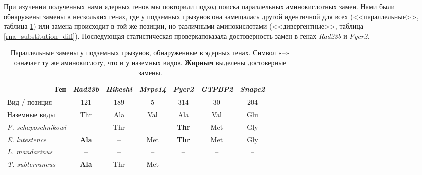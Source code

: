 При изучении полученных нами ядерных генов мы повторили подход поиска параллельных аминокислотных замен. Нами были обнаружены замены в нескольких генах, где у подземных грызунов она замещалась другой идентичной для всех (<<параллельные>>, таблица \ref{rna_substitution_all}) или замена происходит в той же позиции, но различными аминокислотами (<<дивергентные>>, таблица \ref{rna_substitution_diff}). Последующая статистическая проверкапоказала достоверность замен в генах \textit{Rad23b} и \textit{Pycr2}. 

\begin{table}[h!]
	\caption{Параллельные замены у подземных грызунов, обнаруженные в ядерных генах. Символ «--» означает ту же аминокислоту, что и у наземных видов. \textbf{Жирным} выделены достоверные замены. }\label{rna_substitution_all} \vspace{5mm}
	
	\begin{center}
	\begin{tabular}{|l|c|c|c|c|c|c|c|c|c|c}
		\hline
		\multicolumn{1}{|r|}{Ген} & \textit{Rad23b} & \textit{Hikeshi} & \textit{Mrps14} & \textit{Pycr2} & \textit{GTPBP2} & \textit{Snapc2} \\ \hline
		Вид   / позиция & 121 & 189 & 5 & 314 & 30 & 204  \\ \hline
		Наземные виды &  Thr & Ala & Val & Ala & Val & Glu  \\ \hline
		\textit{P. schaposchnikowi}  & -- & Thr & -- & \textbf{Thr}  & Met & Gly  \\ \hline
		\textit{E. lutestence}  & \textbf{Ala} & -- & Met & \textbf{Thr} & Met & Gly  \\ \hline
		\textit{L. mandarinus}  & -- & -- & -- & --  & -- & --  \\ \hline
		\textit{T. subterraneus} & \textbf{Ala} & Thr  & Met & -- & -- & -- \\ \hline
	\end{tabular}
\end{center}
\end{table}


